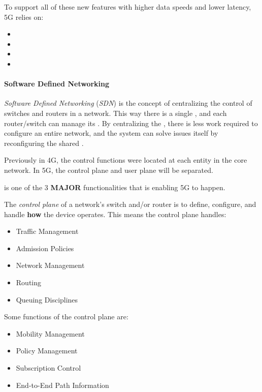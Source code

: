 To support all of these new features with higher data speeds and lower latency, 5G relies on:
\begin{itemize}[noitemsep]
\item {}
\item {}
\item {}
\item {}
\end{itemize}

\paragraph{Software Defined Networking}\label{par:SDN}
\begin{definition}\label{def:Software_Defined_Networking}\label{def:SDN}
  \emph{Software Defined Networking} (\emph{SDN}) is the concept of centralizing the control of switches and routers in a network.
  This way there is a single , and each router/switch can manage its .
  By centralizing the , there is less work required to configure an entire network, and the system can solve issues itself by reconfiguring the shared .

  Previously in 4G, the control functions were located at each entity in the core network.
  In 5G, the control plane and user plane will be separated.

  \begin{remark}\label{rmk:SDN_Core_5G}
     is one of the 3 \textbf{MAJOR} functionalities that is enabling 5G to happen.
  \end{remark}
\end{definition}

\begin{definition}\label{def:Control_Plane}
  The \emph{control plane} of a network's switch and/or router is to define, configure, and handle \textbf{how} the device operates.
  This means the control plane handles:
  \begin{itemize}[noitemsep]
  \item Traffic Management
  \item Admission Policies
  \item Network Management
  \item Routing
  \item Queuing Disciplines
  \end{itemize}

  Some functions of the control plane are:
  \begin{itemize}[noitemsep]
  \item Mobility Management
  \item Policy Management
  \item Subscription Control
  \item End-to-End Path Information
  \end{itemize}
\end{definition}

